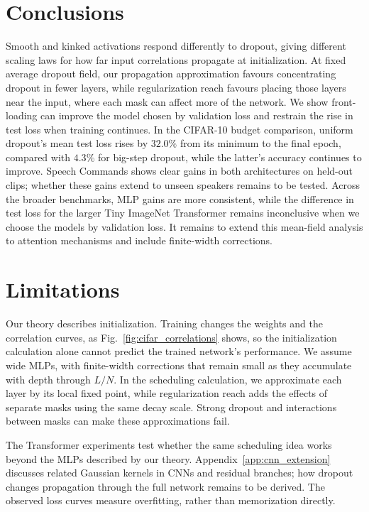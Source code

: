 \section{Conclusions}
Smooth and kinked activations respond differently to dropout, giving different scaling laws for how far input correlations propagate at initialization. At fixed average dropout field, our propagation approximation favours concentrating dropout in fewer layers, while regularization reach favours placing those layers near the input, where each mask can affect more of the network. We show front-loading can improve the model chosen by validation loss and restrain the rise in test loss when training continues. In the CIFAR-10 budget comparison, uniform dropout's mean test loss rises by $32.0\%$ from its minimum to the final epoch, compared with $4.3\%$ for big-step dropout, while the latter's accuracy continues to improve. Speech Commands shows clear gains in both architectures on held-out clips; whether these gains extend to unseen speakers remains to be tested. Across the broader benchmarks, MLP gains are more consistent, while the difference in test loss for the larger Tiny ImageNet Transformer remains inconclusive when we choose the models by validation loss. It remains to extend this mean-field analysis to attention mechanisms and include finite-width corrections.

\section{Limitations}
Our theory describes initialization. Training changes the weights and the correlation curves, as Fig.~\ref{fig:cifar_correlations} shows, so the initialization calculation alone cannot predict the trained network's performance. We assume wide MLPs, with finite-width corrections that remain small as they accumulate with depth through $L/N$. In the scheduling calculation, we approximate each layer by its local fixed point, while regularization reach adds the effects of separate masks using the same decay scale. Strong dropout and interactions between masks can make these approximations fail.

The Transformer experiments test whether the same scheduling idea works beyond the MLPs described by our theory. Appendix~\ref{app:cnn_extension} discusses related Gaussian kernels in CNNs and residual branches; how dropout changes propagation through the full network remains to be derived. The observed loss curves measure overfitting, rather than memorization directly.

